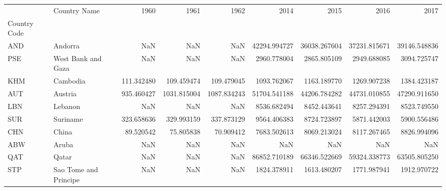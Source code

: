\begin{tabular}{llrrrrrrr}
\toprule
{} &           Country Name &        1960 &         1961 &         1962 &          2014 &          2015 &          2016 &          2017 \\
Country Code &                        &             &              &              &               &               &               &               \\
\midrule
AND          &                Andorra &         NaN &          NaN &          NaN &  42294.994727 &  36038.267604 &  37231.815671 &  39146.548836 \\
PSE          &     West Bank and Gaza &         NaN &          NaN &          NaN &   2960.778004 &   2865.805109 &   2949.688085 &   3094.725747 \\
KHM          &               Cambodia &  111.342480 &   109.459474 &   109.479045 &   1093.762067 &   1163.189770 &   1269.907238 &   1384.423187 \\
AUT          &                Austria &  935.460427 &  1031.815004 &  1087.834243 &  51704.541188 &  44206.784282 &  44731.010855 &  47290.911650 \\
LBN          &                Lebanon &         NaN &          NaN &          NaN &   8536.682494 &   8452.443641 &   8257.294391 &   8523.749550 \\
SUR          &               Suriname &  323.658636 &   329.993159 &   337.873129 &   9564.406383 &   8724.723897 &   5871.442003 &   5900.556486 \\
CHN          &                  China &   89.520542 &    75.805838 &    70.909412 &   7683.502613 &   8069.213024 &   8117.267465 &   8826.994096 \\
ABW          &                  Aruba &         NaN &          NaN &          NaN &           NaN &           NaN &           NaN &           NaN \\
QAT          &                  Qatar &         NaN &          NaN &          NaN &  86852.710189 &  66346.522669 &  59324.338773 &  63505.805250 \\
STP          &  Sao Tome and Principe &         NaN &          NaN &          NaN &   1824.378911 &   1613.480207 &   1771.987941 &   1912.970722 \\
\bottomrule
\end{tabular}
